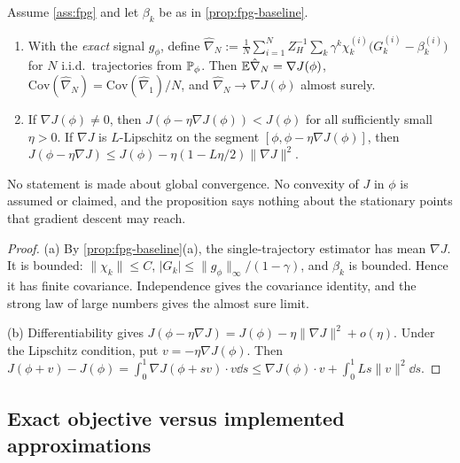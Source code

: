 \begin{proposition}\label{prop:fpg-mc}
Assume \cref{ass:fpg} and let $\beta_k$ be as in \cref{prop:fpg-baseline}.
\begin{enumerate}[nosep,label=(\alph*)]
\item With the \emph{exact} signal $g_\phi$, define
  $\hat\nabla_N:=\frac1N\sum_{i=1}^NZ_H^{-1}\sum_k\gamma^k\chi^{(i)}_k\big(G^{(i)}_k-\beta^{(i)}_k\big)$ for $N$ i.i.d.\ trajectories from $\mathbb{P}_\phi$.
  Then $\mathbb{E}\hat\nabla_N=\nabla J(\phi)$, $\mathrm{Cov}(\hat\nabla_N)=\mathrm{Cov}(\hat\nabla_1)/N$, and $\hat\nabla_N\to\nabla J(\phi)$ almost surely.
\item If $\nabla J(\phi)\ne0$, then $J(\phi-\eta\nabla J(\phi))<J(\phi)$ for all sufficiently small $\eta>0$.
  If $\nabla J$ is $L$-Lipschitz on the segment $[\phi,\phi-\eta\nabla J(\phi)]$, then $J(\phi-\eta\nabla J)\le J(\phi)-\eta(1-L\eta/2)\|\nabla J\|^2$.
\end{enumerate}
No statement is made about global convergence. No convexity of $J$ in $\phi$ is assumed or claimed, and the proposition says nothing about the stationary points that gradient descent may reach.
\end{proposition}
\begin{proof}
(a) By \cref{prop:fpg-baseline}(a), the single-trajectory estimator has mean $\nabla J$.
It is bounded: $\|\chi_k\|\le C$, $|G_k|\le\|g_\phi\|_\infty/(1-\gamma)$, and $\beta_k$ is bounded. Hence it has finite covariance.
Independence gives the covariance identity, and the strong law of large numbers gives the almost sure limit.

(b) Differentiability gives $J(\phi-\eta\nabla J)=J(\phi)-\eta\|\nabla J\|^2+o(\eta)$.
Under the Lipschitz condition, put $v=-\eta\nabla J(\phi)$. Then
$J(\phi+v)-J(\phi)=\int_0^1\nabla J(\phi+sv)\cdot v\dd s\le\nabla J(\phi)\cdot v+\int_0^1Ls\|v\|^2\dd s$.
\end{proof}

\subsection{Exact objective versus implemented approximations}\label{sec:fpg-approx}

